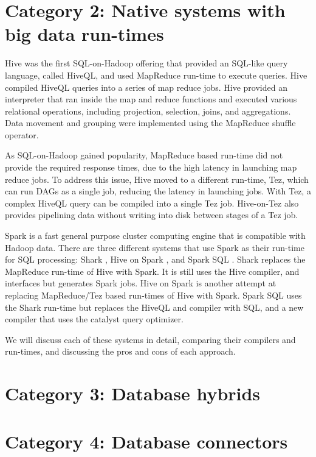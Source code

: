 \documentclass{vldb}
\begin{document}
\section{Category 2: Native systems with big data run-times}

Hive \cite{hive} was the first SQL-on-Hadoop offering that provided an SQL-like query language, called HiveQL, and used MapReduce run-time to execute queries. Hive compiled HiveQL queries into a series of map reduce jobs. Hive provided an interpreter that ran inside the map and reduce functions and executed various relational operations, including projection, selection, joins, and aggregations. Data movement and grouping were implemented using the MapReduce shuffle operator. 

As SQL-on-Hadoop gained popularity, MapReduce based run-time did not provide the required response times, due to the high latency in launching map reduce jobs. To address this issue, Hive moved to a different run-time, Tez, which can run DAGs as a single job, reducing the latency in launching jobs. With Tez, a complex HiveQL query can be compiled into a single Tez job. Hive-on-Tez also provides pipelining data without writing into disk between stages of a Tez job. 

Spark is a fast general purpose cluster computing engine that is compatible with Hadoop data.  There are three different systems that use Spark as their run-time for SQL processing: Shark \cite{sharksigmod13}, Hive on Spark \cite{hiveOnSpark}, and Spark SQL \cite{sparkSQL}. Shark replaces the MapReduce run-time of Hive \cite{hive} with Spark. It is still uses the Hive compiler, and interfaces but generates Spark jobs. Hive on Spark is another attempt at replacing MapReduce/Tez based run-times of Hive with Spark. Spark SQL uses the Shark \cite{sharksigmod13} run-time but replaces the HiveQL and compiler with SQL, and a new compiler that uses the catalyst query optimizer. 

We will discuss each of these systems in detail, comparing their compilers and run-times, and discussing the pros and cons of each approach.


\section{Category 3: Database hybrids}

\section{Category 4: Database connectors}
\end{document}
